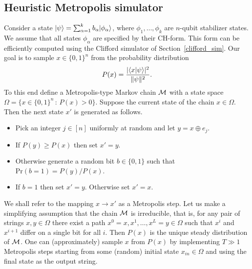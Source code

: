 \subsection{Heuristic Metropolis simulator}
\label{heuristic}Consider a state
$|\psi\rangle=\sum_{\alpha=1}^k b_\alpha |\phi_\alpha\rangle$,
where $\phi_1,\ldots,\phi_k$ are $n$-qubit stabilizer states.
We assume that all states $\phi_\alpha$ are specified by their CH-form.
This form can be efficiently computed using 
the Clifford simulator of Section~\ref{clifford_sim}.
Our goal is to sample $x\in \{0,1\}^n$ from the probability distribution
\[
P(x)=\frac{|\langle x|\psi\rangle|^2}{\|\psi\|^2}.
\]
To this end define a Metropolis-type Markov chain ${\cal M }$ with a state space
$\Omega=\{ x\in \{0,1\}^n\, : \, P(x)>0\}$.
 Suppose the current state of the chain $x\in \Omega$.
Then the next state $x'$ is generated as follows.\\
\begin{itemize}
\item Pick an integer $j\in [n]$ uniformly at random and let $y=x\oplus e_j$.
\item If $P(y)\ge P(x)$ then set $x'=y$.
\item Otherwise generate a random bit $b\in \{0,1\}$ such that $\mathrm{Pr}(b=1)=P(y)/P(x)$.
\item If $b=1$ then set $x'=y$. Otherwise set $x'=x$.
\end{itemize}
We shall refer to the mapping $x\to x'$ as a Metropolis step.
Let us make a simplifying assumption that the chain ${\cal M }$ is irreducible, that is,
for any pair of strings $x,y\in \Omega$  there exist a path
$x^0=x,x^1,\ldots,x^L=y\in \Omega$ such that $x^i$ and $x^{i+1}$ differ on 
a single bit for all $i$. Then 
$P(x)$ is the unique steady distribution of ${\cal M }$.
One can (approximately) sample $x$ from $P(x)$ by 
implementing $T\gg 1$ Metropolis steps 
starting from some (random) initial state $x_{in}\in \Omega$
and using the final state as the output string. 

